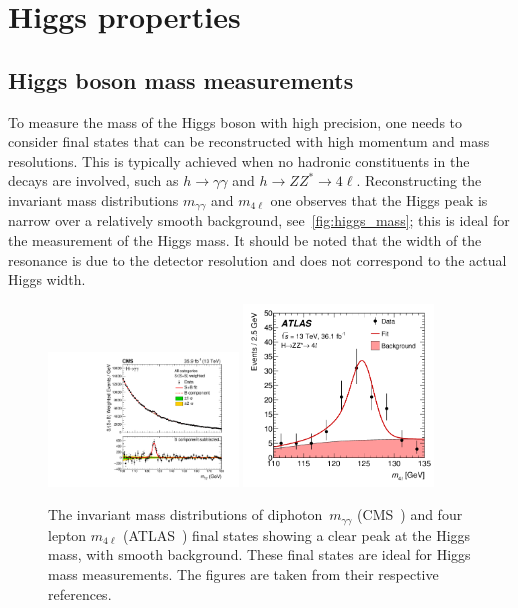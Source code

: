 \section{Higgs properties \label{sec:Higgsprop} }
\subsection{Higgs boson mass measurements}
To measure the mass of the Higgs boson with high precision, one needs to consider final states that can be reconstructed with high momentum and mass resolutions. This is typically achieved when no hadronic constituents in the decays are involved, such as  $ h \to \gamma \gamma$ and $ h \to Z Z^*\to 4 \ell$. Reconstructing the invariant mass distributions $m_{\gamma \gamma}$ and $m_{4\ell}$ one observes that the Higgs peak is narrow over a relatively smooth background, see~\autoref{fig:higgs_mass}; this is ideal for the measurement of the Higgs mass. It should be noted that the width of the resonance is due to the detector resolution and does not correspond to the actual Higgs width.\\
\begin{figure}[t!]
	\begin{center}
		\includegraphics[width=0.45\textwidth]{figures/Higgs_results/CMS-HIG-19-004_Figure_005-b}
		\includegraphics[width=0.45\textwidth]{figures/Higgs_results/dataAll_H4l_m4l_pdf_constrained} 
		\caption{The invariant mass distributions of diphoton~$m_{\gamma \gamma}$ (CMS~\cite{CMS:2020xrn}) and four lepton $m_{4 \ell}$ (ATLAS~\cite{ATLAS:2018tdk}) final states showing a clear peak at the Higgs mass, with smooth background. These final states are ideal for Higgs mass measurements. The figures are taken from their respective references. \label{fig:higgs_mass} }
	\end{center}
\end{figure}
